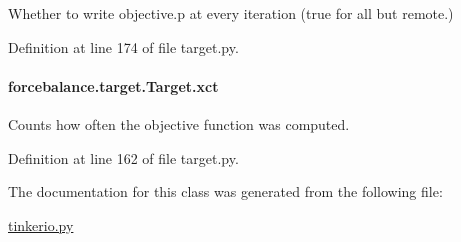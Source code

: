 Whether to write objective.\-p at every iteration (true for all but remote.) 



Definition at line 174 of file target.\-py.

\hypertarget{classforcebalance_1_1target_1_1Target_aad2e385cfbf7b4a68f1c2cb41133fe82}{
\paragraph[{xct}]{\setlength{\rightskip}{0pt plus 5cm}forcebalance.\-target.\-Target.\-xct\hspace{0.3cm}{\ttfamily [inherited]}}}\label{classforcebalance_1_1target_1_1Target_aad2e385cfbf7b4a68f1c2cb41133fe82}


Counts how often the objective function was computed. 



Definition at line 162 of file target.\-py.



The documentation for this class was generated from the following file\-:\begin{DoxyCompactItemize}
\item 
\hyperlink{tinkerio_8py}{tinkerio.\-py}\end{DoxyCompactItemize}
